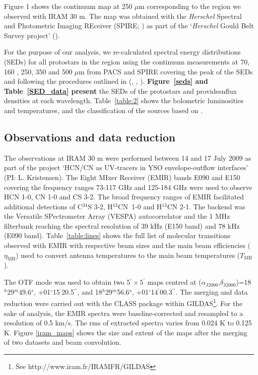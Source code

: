 \documentclass{aa}
\begin{document}
Figure 1 shows the continuum map at 250 $\mu$m corresponding to the region we observed with 
IRAM 30 m. The map was obtained with the \textit{Herschel} Spectral and Photometric Imaging 
REceiver (SPIRE; \citealt{Gri10}) as part of the ‘\textit{Herschel} Gould Belt Survey project' (\citealt{And10}). 

For the purpose of our analysis, we re-calculated spectral energy distributions (SEDs) for 
all protostars in the region using the continuum measurements at 70, 160 , 250, 350 and 500 $\mu$m 
from PACS and SPIRE covering the peak of the SEDs and following the procedures outlined in (\citealt{And10}, \citealt{Kir13}, \citealt{Kon15}).
\textbf{Figure~\ref{seds} and Table~\ref{SED_data} present} the SEDs of the protostars and providesnflux densities at each wavelength. Table~\ref{table:2} shows the bolometric luminosities
and temperatures, and the classification of the sources based on \citet{Eva09}.

\subsection{Observations and data reduction}
\label{subsection:data}
The observations at IRAM 30 m were performed between 14 and 17 July 2009 as part of the project ‘HCN/CN as UV-tracers in YSO envelope-outflow interfaces’ (PI: L. Kristensen). The Eight MIxer Receiver (EMIR) bands E090 and E150 covering the frequency ranges 73-117 GHz and 125-184 GHz were used to observe HCN 1-0, CN 1-0 and CS 3-2. The broad frequency ranges of EMIR facilitated additional detections 
of C$^{34}$S 3-2, H$^{13}$CN~\mbox{1-0} and H$^{13}$CN 2-1. The
backend was the Versatile SPectrometer Array (VESPA) autocorrelator and the 1 MHz filterbank
reaching the spectral resolution of 39 kHz (E150 band) and 78 kHz (E090 band).
Table~\ref{table:lines} shows the full list of molecular transitions observed with EMIR with 
respective beam sizes and the main beam efficiencies ($\eta_{\mathrm{MB}}$) used to convert antenna temperatures 
to the main beam temperatures ($T_{\mathrm{MB}}$). 

The OTF mode was used to obtain two 5$^{\prime}\times5^{\prime}$ maps centred at ($\alpha_\mathrm{J2000}$,$\delta_\mathrm{J2000}$)=18$^h$29$^m$49.6$^s$,
+01$^{\circ}$15$^{\prime}$20.5$^{\prime\prime}$, and 18$^h$29$^m$56.6$^s$, +01$^{\circ}$14$^{\prime}$00.3$^{\prime\prime}$. 
The merging and data reduction were carried out with the CLASS package within GILDAS\footnote{See
http://www.iram.fr/IRAMFR/GILDAS}. For the sake of analysis, the EMIR spectra were
baseline-corrected and resampled to a resolution of 0.5 km/s. The rms of extracted spectra varies from 0.024 K to 0.125 K. Figure \ref{iram_maps} shows the size and extent of the maps after the merging of two datasets and beam convolution.
\end{document}
